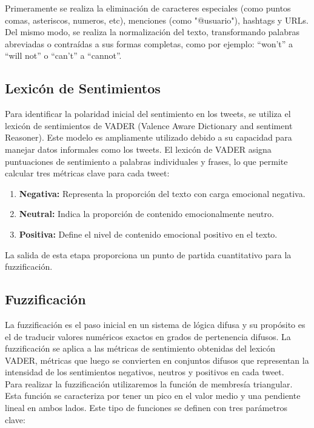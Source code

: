 \documentclass[sigconf, review=false, nonacm]{acmart}
\begin{document}
Primeramente se realiza la eliminación de caracteres especiales (como puntos comas, asteriscos, numeros, etc),
menciones (como "@usuario"), hashtags y URLs. Del mismo modo, se realiza la normalización del texto,
transformando palabras abreviadas o contraídas a sus formas completas, como por ejemplo: ``won't'' a ``will
not'' o ``can't'' a ``cannot''.

\subsection{Lexicón de Sentimientos}
Para identificar la polaridad inicial del sentimiento en los tweets,
se utiliza el lexicón de sentimientos de VADER (Valence Aware Dictionary and sentiment Reasoner).
Este modelo es ampliamente utilizado debido a su capacidad para manejar datos informales como los tweets.
El lexicón de VADER asigna puntuaciones de sentimiento a palabras individuales y frases, lo que permite calcular
tres métricas clave para cada tweet:

\begin{enumerate}
	\item \textbf{Negativa:} Representa la proporción del texto con carga emocional negativa.
	\item \textbf{Neutral:} Indica la proporción de contenido emocionalmente neutro.
	\item \textbf{Positiva:} Define el nivel de contenido emocional positivo en el texto.
\end{enumerate}

La salida de esta etapa proporciona un punto de partida cuantitativo para la fuzzificación.

\subsection{Fuzzificación}
La fuzzificación es el paso inicial en un sistema de lógica difusa y su propósito es el de traducir valores
numéricos exactos en grados de pertenencia difusos. La fuzzificación se aplica a las métricas de sentimiento
obtenidas del lexicón VADER, métricas que luego se convierten en conjuntos difusos que representan la intensidad
de los sentimientos negativos, neutros y positivos en cada tweet.\\

Para realizar la fuzzificación utilizaremos la función de membresía triangular. Esta
función se caracteriza por tener un pico en el valor medio y una pendiente lineal en ambos lados. Este tipo de
funciones se definen con tres parámetros clave:
\end{document}
